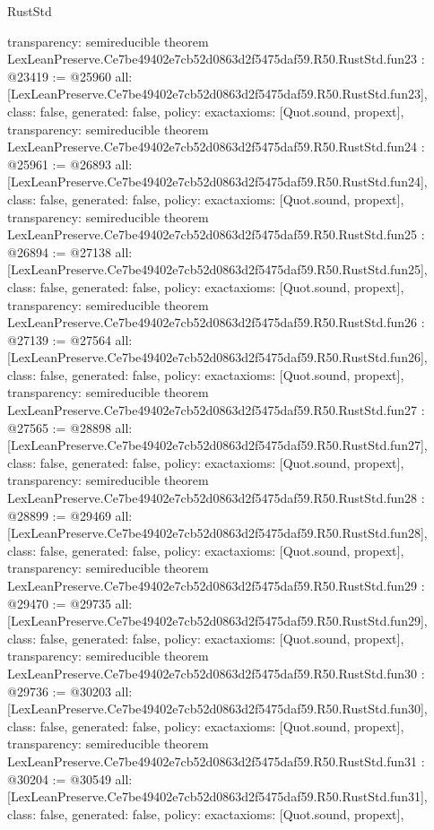 \begin{lexlean}{RustStd}
\begin{coremodule}
{  transparency: semireducible
}
theorem LexLeanPreserve.Ce7be49402e7cb52d0863d2f5475daf59.R50.RustStd.fun23 : @23419 := @25960 {
  all: [LexLeanPreserve.Ce7be49402e7cb52d0863d2f5475daf59.R50.RustStd.fun23],
  class: false,
  generated: false,
  policy: exact{axioms: [Quot.sound, propext]},
  transparency: semireducible
}
theorem LexLeanPreserve.Ce7be49402e7cb52d0863d2f5475daf59.R50.RustStd.fun24 : @25961 := @26893 {
  all: [LexLeanPreserve.Ce7be49402e7cb52d0863d2f5475daf59.R50.RustStd.fun24],
  class: false,
  generated: false,
  policy: exact{axioms: [Quot.sound, propext]},
  transparency: semireducible
}
theorem LexLeanPreserve.Ce7be49402e7cb52d0863d2f5475daf59.R50.RustStd.fun25 : @26894 := @27138 {
  all: [LexLeanPreserve.Ce7be49402e7cb52d0863d2f5475daf59.R50.RustStd.fun25],
  class: false,
  generated: false,
  policy: exact{axioms: [Quot.sound, propext]},
  transparency: semireducible
}
theorem LexLeanPreserve.Ce7be49402e7cb52d0863d2f5475daf59.R50.RustStd.fun26 : @27139 := @27564 {
  all: [LexLeanPreserve.Ce7be49402e7cb52d0863d2f5475daf59.R50.RustStd.fun26],
  class: false,
  generated: false,
  policy: exact{axioms: [Quot.sound, propext]},
  transparency: semireducible
}
theorem LexLeanPreserve.Ce7be49402e7cb52d0863d2f5475daf59.R50.RustStd.fun27 : @27565 := @28898 {
  all: [LexLeanPreserve.Ce7be49402e7cb52d0863d2f5475daf59.R50.RustStd.fun27],
  class: false,
  generated: false,
  policy: exact{axioms: [Quot.sound, propext]},
  transparency: semireducible
}
theorem LexLeanPreserve.Ce7be49402e7cb52d0863d2f5475daf59.R50.RustStd.fun28 : @28899 := @29469 {
  all: [LexLeanPreserve.Ce7be49402e7cb52d0863d2f5475daf59.R50.RustStd.fun28],
  class: false,
  generated: false,
  policy: exact{axioms: [Quot.sound, propext]},
  transparency: semireducible
}
theorem LexLeanPreserve.Ce7be49402e7cb52d0863d2f5475daf59.R50.RustStd.fun29 : @29470 := @29735 {
  all: [LexLeanPreserve.Ce7be49402e7cb52d0863d2f5475daf59.R50.RustStd.fun29],
  class: false,
  generated: false,
  policy: exact{axioms: [Quot.sound, propext]},
  transparency: semireducible
}
theorem LexLeanPreserve.Ce7be49402e7cb52d0863d2f5475daf59.R50.RustStd.fun30 : @29736 := @30203 {
  all: [LexLeanPreserve.Ce7be49402e7cb52d0863d2f5475daf59.R50.RustStd.fun30],
  class: false,
  generated: false,
  policy: exact{axioms: [Quot.sound, propext]},
  transparency: semireducible
}
theorem LexLeanPreserve.Ce7be49402e7cb52d0863d2f5475daf59.R50.RustStd.fun31 : @30204 := @30549 {
  all: [LexLeanPreserve.Ce7be49402e7cb52d0863d2f5475daf59.R50.RustStd.fun31],
  class: false,
  generated: false,
  policy: exact{axioms: [Quot.sound, propext]},
}
\end{coremodule}
\end{lexlean}
